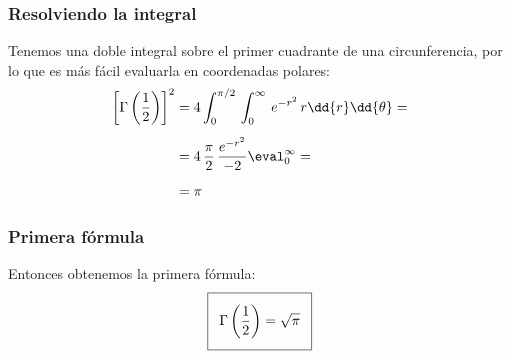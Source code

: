 \begin{frame}
\frametitle{Resolviendo la integral}
Tenemos una doble integral sobre el primer cuadrante de una circunferencia, por lo que es más fácil evaluarla en coordenadas polares:
\begin{align*}
\left[ \Gamma \left( \dfrac{1}{2} \right) \right]^{2} &= 4 \int_{0}^{\pi/2} \, \int_{0}^{\infty} \, e^{-r^{2}} \, r \dd{r} \dd{\theta} = \\[0.5em]
&= 4 \, \dfrac{\pi}{2} \, \dfrac{e^{-r^{2}}}{-2}\eval_{0}^{\infty} = \\[0.5em]
&= \pi
\end{align*}
\end{frame}
\begin{frame}
\frametitle{Primera fórmula}
Entonces obtenemos la primera fórmula:
\begin{align}
\addtolength{\fboxsep}{5pt}\boxed{
\Gamma \left( \dfrac{1}{2} \right) = \sqrt{\pi}}
\label{eq:ecuacion_05_03}
\end{align}
\end{frame}
